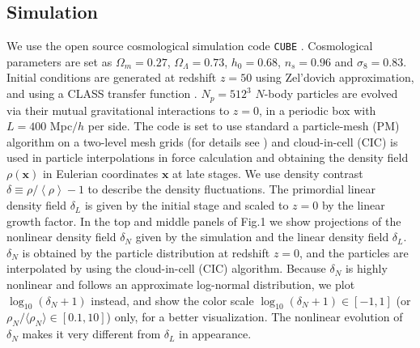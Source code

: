 \documentclass[aps,prd,twocolumn,superscriptaddress,amsfont,amssymb,amsmath,nofootinbib,showpacs,balancelastpage]{revtex4-1}
\newcommand{\bs}{\boldsymbol}
\newcommand{\lb}{\left\langle}
\newcommand{\rb}{\right\rangle}
\begin{document}
\subsection{Simulation}\label{ss.sim}
We use the open source cosmological simulation code {\tt CUBE} %
\citep{cafcube}.
Cosmological parameters are set as
$\Omega_m=0.27$, $\Omega_\Lambda=0.73$, $h_0=0.68$, $n_s=0.96$ and $\sigma_8=0.83$.
Initial conditions are generated at redshift $z=50$ 
using Zel'dovich approximation, and using a CLASS transfer function
\citep{2011JCAP...07..034B}.
$N_p=512^3$ $N$-body particles are evolved via 
their mutual gravitational interactions to $z=0$, in a periodic box with $L=400$ 
Mpc$/h$ per side. The code is set to use standard a particle-mesh (PM) algorithm 
\cite{1988csup.book.....H} on a two-level mesh grids
(for details see \cite{2013MNRAS.436..540H}) and cloud-in-cell
(CIC) is used in particle interpolations in force 
calculation and obtaining the density field $\rho({\bs x})$ in Eulerian coordinates 
${\bs x}$ at late stages. We use density contrast $\delta\equiv\rho/\lb\rho\rb-1$ 
to describe the density fluctuations. The primordial linear density field $
\delta_L$ is given by the initial stage and scaled to $z=0$ by the linear growth 
factor. In the top and middle panels of Fig.1 we show projections of the nonlinear density field
$\delta_N$ given by the simulation and the linear density field $\delta_L$.
$\delta_N$ is obtained by the particle distribution at redshift $z=0$, and
the particles are interpolated by using the cloud-in-cell (CIC) algorithm.
Because $\delta_N$ is highly nonlinear and follows an approximate
log-normal distribution, we plot $\log_{10}(\delta_N+1)$ instead, and show
the color scale $\log_{10}(\delta_N+1)\in[-1,1]$ (or $\rho_N/\langle\rho_N\rangle\in[0.1,10]$)
only, for a better visualization.
The nonlinear evolution of $\delta_N$ makes it very different from $\delta_L$
in appearance.
\end{document}
